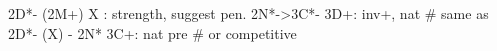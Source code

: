 2D*- (2M+)
X  : strength, suggest pen.
2N*->3C*- 3D+: inv+, nat  # same as 2D*- (X) - 2N*
3C+: nat pre  # or competitive
